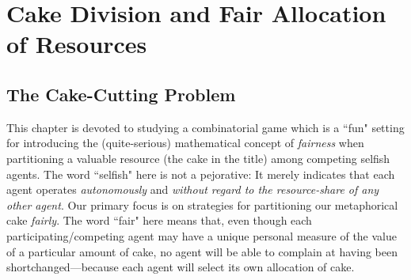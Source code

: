 
\chapter{Cake Division and Fair Allocation of Resources}
\label{Appendix:CakeDivision}

\section{The Cake-Cutting Problem}
\label{sec:cake-problem}

\noindent {}

\bigskip

 

\noindent
This chapter is devoted to studying a combinatorial game which is a ``fun" setting for introducing the (quite-serious) mathematical concept of {\em fairness} when partitioning a valuable resource (the cake in the title) among competing selfish agents.   The word ``selfish" here is not a pejorative: It merely indicates that each agent operates {\em autonomously} and {\em without regard to the resource-share of any other agent}.  Our primary focus is on strategies for partitioning our metaphorical cake \textit{fairly}.  The word ``fair" here means that, even though each participating/competing agent may have a unique personal measure of the value of a particular amount of cake, no  agent will be able to complain at having been shortchanged---because each agent will select its own allocation of cake.

